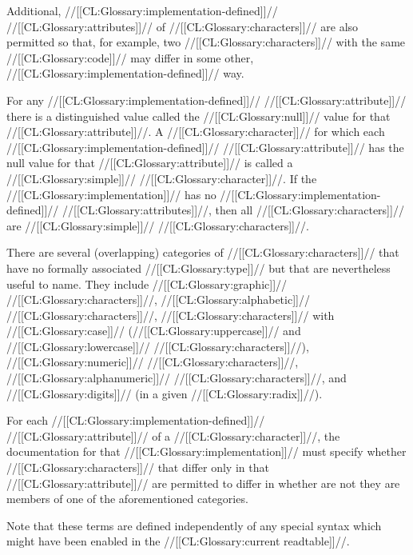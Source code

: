 
Additional, //[[CL:Glossary:implementation-defined]]// //[[CL:Glossary:attributes]]// of //[[CL:Glossary:characters]]// are also permitted so that, for example,  two //[[CL:Glossary:characters]]// with the same //[[CL:Glossary:code]]// may differ  in some other, //[[CL:Glossary:implementation-defined]]// way.

For any //[[CL:Glossary:implementation-defined]]// //[[CL:Glossary:attribute]]// there is a distinguished value called the //[[CL:Glossary:null]]// value for that //[[CL:Glossary:attribute]]//.  A //[[CL:Glossary:character]]// for which each //[[CL:Glossary:implementation-defined]]// //[[CL:Glossary:attribute]]// has the null value for that //[[CL:Glossary:attribute]]// is called a //[[CL:Glossary:simple]]// //[[CL:Glossary:character]]//. If the //[[CL:Glossary:implementation]]// has no //[[CL:Glossary:implementation-defined]]// //[[CL:Glossary:attributes]]//, then all //[[CL:Glossary:characters]]// are //[[CL:Glossary:simple]]// //[[CL:Glossary:characters]]//.

\endSubsection%


There are several (overlapping) categories of //[[CL:Glossary:characters]]// that have no formally associated //[[CL:Glossary:type]]// but that are nevertheless useful to name.  They include
     //[[CL:Glossary:graphic]]// //[[CL:Glossary:characters]]//, 
     //[[CL:Glossary:alphabetic]]// //[[CL:Glossary:characters]]//,
     //[[CL:Glossary:characters]]// with //[[CL:Glossary:case]]// 
       (//[[CL:Glossary:uppercase]]// and //[[CL:Glossary:lowercase]]// //[[CL:Glossary:characters]]//),
     //[[CL:Glossary:numeric]]// //[[CL:Glossary:characters]]//,
     //[[CL:Glossary:alphanumeric]]// //[[CL:Glossary:characters]]//,
 and //[[CL:Glossary:digits]]// (in a given //[[CL:Glossary:radix]]//).

For each //[[CL:Glossary:implementation-defined]]// //[[CL:Glossary:attribute]]// of a //[[CL:Glossary:character]]//, the documentation for that //[[CL:Glossary:implementation]]// must specify whether  //[[CL:Glossary:characters]]// that differ only in that //[[CL:Glossary:attribute]]// are permitted to differ in whether are not they are members of one of the aforementioned categories.

Note that these terms are defined independently of any special syntax  which might have been enabled in the //[[CL:Glossary:current readtable]]//.

